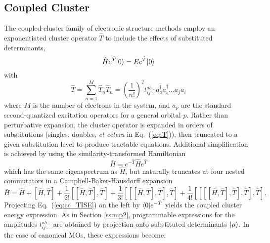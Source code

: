 \subsection{Coupled Cluster} \label{ss:cc}
The coupled-cluster family of electronic structure methods
\cite{Sinanoglu1964,Cizek1966,Sinanoglu1964,Crawford2000}
employ an exponentiated cluster operator $\hat{T}$ to include the effects of substituted determinants,
\begin{equation} \label{eq:cc_TISE}
    \hat{H}e^{\hat{T}}| 0 \rangle = Ee^{\hat{T}}| 0 \rangle
\end{equation}
with
\begin{subequations}
    \begin{equation} \label{eq:T}
        \hat{T} = \sum_{n=1}^M\hat{T}_n
    \end{equation}
    \begin{equation} \label{eq:T_n}
        \hat{T}_n = \left(\frac{1}{n!}\right)^2 t_{ij\ldots}^{ab\ldots}a_a^{\dagger}a_b^{\dagger}\ldots a_j a_i
    \end{equation}
\end{subequations}
where $M$ is the number of electrons in the system, and $a_p$ are the standard second-quantized 
excitation operators for a general orbital $p$.
Rather than perturbative expansion, the cluster operator is expanded in orders of substitutions 
(singles, doubles, \textit{et cetera} in Eq.~(\ref{eq:T})), then truncated to a given substitution 
level to produce tractable equations. Additional simplification is achieved by using the 
similarity-transformed Hamiltonian
\begin{equation} \label{eq:Hbar}
    \bar{H} = e^{-\hat{T}}\hat{H}e^{\hat{T}}
\end{equation}
which has the same eigenspectrum as $\hat{H}$, but naturally truncates at four nested commutators in a Campbell-Baker-Hausdorff expansion
\begin{equation} \label{eq:cbh}
    \bar{H} = \hat{H} + [\hat{H}, \hat{T}] + \frac{1}{2!}[[\hat{H}, \hat{T}], \hat{T}] + \frac{1}{3!}[[[\hat{H}, \hat{T}], \hat{T}], \hat{T}] + \frac{1}{4!}[[[[\hat{H}, \hat{T}], \hat{T}], \hat{T}], \hat{T}].
\end{equation}
Projecting Eq.~(\ref{eq:cc_TISE}) on the left by $\langle0 |e^{-\hat{T}}$ yields the coupled cluster 
energy expression. As in Section \ref{ss:mp2}, programmable expressions for the amplitudes 
$t_{ij\ldots}^{ab\ldots}$ are obtained by projection onto substituted determinants $| \mu \rangle$. 
In the case of canonical MOs, these expressions become:
